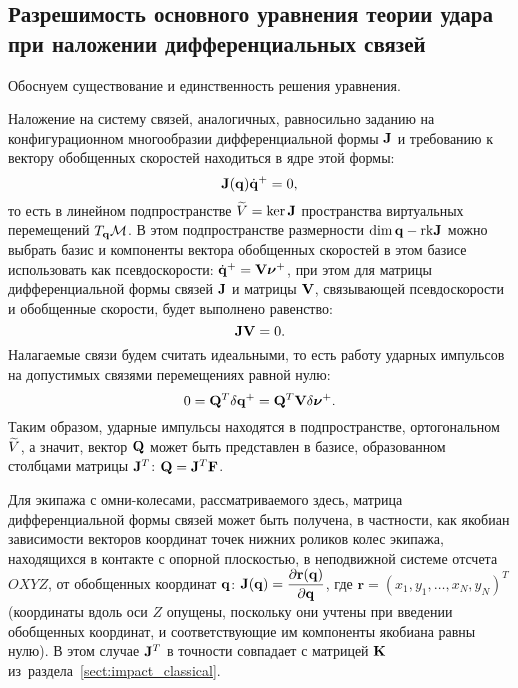 
\subsection{Разрешимость основного уравнения теории удара при наложении дифференциальных связей}

Обоснуем существование и единственность решения уравнения.

Наложение на систему связей, аналогичных, равносильно заданию на конфигурационном многообразии дифференциальной формы $\mathbf{J}$ и требованию к вектору обобщенных скоростей находиться в ядре этой формы:
\begin{equation}\label{eq:constraints_form}
    \mathbf{J}(\mathbf{q})\dot{\mathbf{q}}^+ = 0,
\end{equation}
то есть в линейном подпространстве $\widetilde{V} = \ker \mathbf{J}$ пространства виртуальных перемещений $T_{\mathbf{q}}\mathcal{M}$. В этом подпространстве размерности $\dim \mathbf{q} - \mathrm{rk} \mathbf{J}$ можно выбрать базис и компоненты вектора обобщенных скоростей в этом базисе использовать как псевдоскорости: $\dot{\mathbf{q}}^+ = \mathbf{V}\boldsymbol{\mathbf{\nu}}^+$, при этом для матрицы дифференциальной формы связей $\mathbf{J}$ и матрицы $\mathbf{V}$, связывающей псевдоскорости и обобщенные скорости, будет выполнено равенство:
\begin{equation}\label{eq:constraints_orth}
    \mathbf{J}\mathbf{V} = 0.    
\end{equation}
Налагаемые связи будем считать идеальными, то есть работу ударных импульсов на допустимых связями перемещениях равной нулю:
\begin{equation}\label{eq:constraints_ideal}
    0 = \mathbf{Q}^T \delta\mathbf{q}^+ = \mathbf{Q}^T \mathbf{V}\delta\boldsymbol{\mathbf{\nu}}^+.
\end{equation}
Таким образом, ударные импульсы находятся в подпространстве, ортогональном $\widetilde{V}$, а значит, вектор $\mathbf{Q}$ может быть представлен в базисе, образованном столбцами матрицы $\mathbf{J}^T$: $\mathbf{Q} = \mathbf{J}^T\mathbf{F}$.

Для экипажа с омни-колесами, рассматриваемого здесь, матрица дифференциальной формы связей может быть получена, в частности, как якобиан зависимости векторов координат точек нижних роликов колес экипажа, находящихся в контакте с опорной плоскостью, в неподвижной системе отсчета $OXYZ$, от обобщенных координат $\mathbf{q}$: $\mathbf{J}(\mathbf{q}) = \displaystyle\frac{\displaystyle \partial \mathbf{r}(\mathbf{q})}{\displaystyle \partial \mathbf{q}}$, где $\mathbf{r} = ( x_1, y_1, \ldots, x_N, y_N )^T$ (координаты вдоль оси $Z$ опущены, поскольку они учтены при введении обобщенных координат, и соответствующие им компоненты якобиана равны нулю). В этом случае $\mathbf{J}^T$ в точности совпадает с матрицей $\mathbf{K}$ из~раздела~\ref{sect:impact_classical}.

